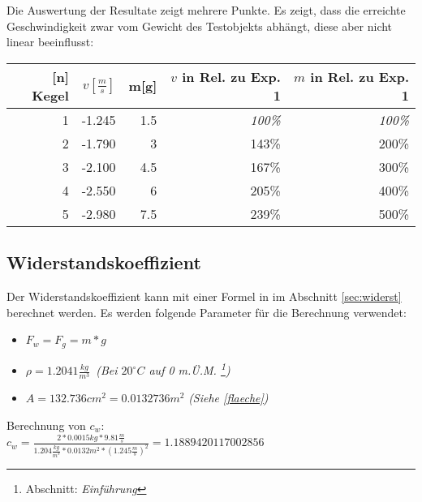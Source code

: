 Die Auswertung der Resultate zeigt mehrere Punkte. Es zeigt, dass die erreichte Geschwindigkeit zwar vom Gewicht des Testobjekts abhängt, diese aber nicht linear beeinflusst:

\begin{tabular}{rrrrr}
	\textbf{[n] Kegel} & \(v[\frac{m}{s}]\) & m[g] & {\small \(v\) in Rel. zu Exp. 1} & {\small \(m\) in Rel. zu Exp. 1} \\ \hline
	1 & -1.245 & 1.5 & \textit{100\%} & \textit{100\%} \\
	2 & -1.790 & 3   & 143\% & 200\% \\
	3 & -2.100 & 4.5 & 167\% & 300\% \\
	4 & -2.550 & 6   & 205\% & 400\% \\
	5 & -2.980 & 7.5 & 239\% & 500\% \\
\end{tabular}

\subsection{Widerstandskoeffizient}

Der Widerstandskoeffizient kann mit einer Formel in im Abschnitt \ref{sec:widerst} berechnet werden. Es werden folgende Parameter für die Berechnung verwendet:
\begin{itemize}
	\item \(F_w = F_g = m * g\)
	\item \(\rho = 1.2041 \frac{kg}{m^3} \)\ \textit{(Bei \(20^\circ C \) auf 0 m.Ü.M. \footnote{\cite{wikiluftdichte} Abschnitt: \textit{Einführung}})}
	\item \(A = 132.736 cm^2 = 0.0132736 m^2\) \textit{(Siehe \ref{flaeche})}
\end{itemize}

Berechnung von $ c_w $: \\

$ c_w = \frac{2 * 0.0015kg * 9.81\frac{m}{s}}{1.204\frac{kg}{m^3}  * 0.0132 m^2 * (1.245\frac{m}{s})^2} = 1.1889420117002856$


